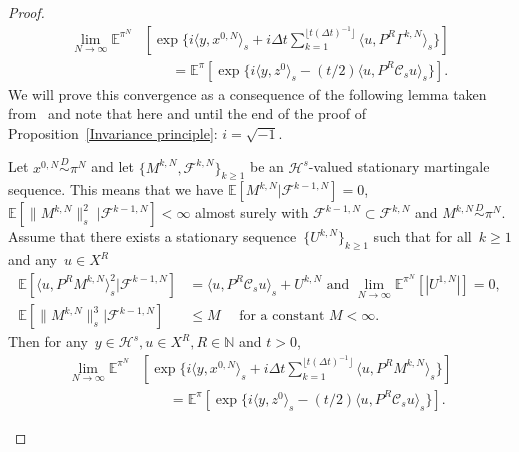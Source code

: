 \begin{proof}
  \begin{equation}
    \begin{split}
      \lim_{N \to \infty} \mathbb{E}^{\pi^N} & [ \exp \{ i \langle y, x^{0,N} \rangle_s + i \Delta t \sum_{k=1}^{\lfloor t (\Delta t)^{-1}  \rfloor} \langle u , P^R \Gamma^{k,N} \rangle_s \} ] \\
      & \qquad = \mathbb{E}^{\pi} [ \exp \{ i \langle y, z^{0} \rangle_s -   (t/2)  \langle u , P^R \mathcal{C}_s u \rangle_s \} ].
    \end{split}
  \end{equation}
  We will prove this convergence as a consequence of the following lemma taken from~\autocite[Lemma 4.3]{Mattingly2010} and note that here and until the end of the proof of Proposition~\ref{Invariance principle}: $i = \sqrt{-1}$.
  
  \begin{lemma}\autocite[Lemma 4.3]{Mattingly2010}
    \label{DLR: Lemma Martingale invariance principle Helping Lemma}
    Let $ x^{0,N}\stackrel{D}{\sim} \pi^N$ and let $ \{ M^{k,N}, \mathcal{F}^{k,N}  \}_{k \geq 1} $ be an $ \mathcal{H}^s $-valued stationary martingale sequence. This means that we have
$  \mathbb{E} \left[  M^{k,N} | \mathcal{F}^{k-1,N} \right] =  0 $,  $  \mathbb{E} \left[ \| M^{k,N} \|_{s}^{2} \; | \mathcal{F}^{k-1,N} \right] <  \infty $ almost surely
with $ \mathcal{F}^{k-1,N} \subset \mathcal{F}^{k,N} $ and $M^{k,N} \stackrel{D}{\sim} \pi^N $. Assume that there exists a stationary sequence~$\{ U^{k,N} \}_{k \geq 1}$ such that for all~$k \geq 1$ and any~$u \in X^R$
\begin{align}
  \label{DLR: Lemma Invariance principle convergence condition 1}
  \mathbb{E}[ \langle u, P^R M^{k,N} \rangle_s^2 | \mathcal{F}^{k-1,N}] & = \langle u, P^R \mathcal{C}_s u \rangle_s + U^{k,N} \text{ and } \lim_{N \to \infty} \mathbb{E}^{\pi^N}[|U^{1,N}|] = 0,\\
  \label{DLR: Lemma Invariance principle convergence condition 2}
   \mathbb{E}[ \| M^{k,N} \|_s^3  |\mathcal{F}^{k-1,N}] & \leq M \quad \text{ for a constant } M < \infty.
\end{align}
Then for any~$y \in \mathcal{H}^s, u \in X^R, R \in \mathbb{N}$ and $t>0$,
  \begin{equation}
    \label{DLR: Lemma Invariance principle result}
    \begin{split}
      \lim_{N \to \infty} \mathbb{E}^{\pi^N} & [ \exp \{ i \langle y, x^{0,N} \rangle_s + i \Delta t \sum_{k=1}^{\lfloor t (\Delta t)^{-1}  \rfloor} \langle u , P^R M^{k,N} \rangle_s \} ] \\
      & \qquad = \mathbb{E}^{\pi} [ \exp \{ i \langle y, z^{0} \rangle_s -   (t/2)  \langle u , P^R \mathcal{C}_s u \rangle_s \} ].
    \end{split}
  \end{equation}


\end{lemma}
\end{proof}

